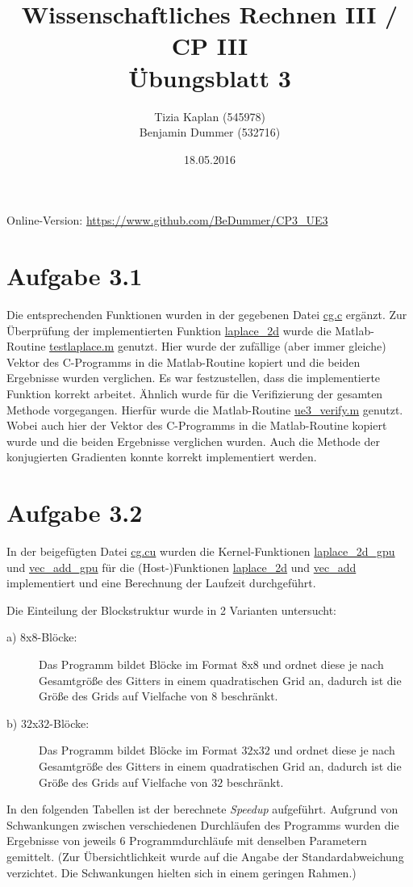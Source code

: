 \documentclass[%
	paper=A4,	%
	pagesize,	%
	DIV=calc,	%
	smallheadings,	%
	ngerman		%
]{scrartcl}
\title{{\bf Wissenschaftliches Rechnen III / CP III}\\Übungsblatt 3}
\author{Tizia Kaplan (545978)\\Benjamin Dummer (532716)}
\date{18.05.2016}
\begin{document}
\maketitle
Online-Version: \href{https://www.github.com/BeDummer/CP3_UE3}{\url{https://www.github.com/BeDummer/CP3_UE3}}

\section*{Aufgabe 3.1}
Die entsprechenden Funktionen wurden in der gegebenen Datei \url{cg.c} ergänzt. Zur Überprüfung der implementierten Funktion \url{laplace\_2d} wurde die Matlab-Routine \url{testlaplace.m} genutzt. Hier wurde der \glqq zufällige \grqq (aber immer gleiche) Vektor des C-Programms in die Matlab-Routine kopiert und die beiden Ergebnisse wurden verglichen. Es war festzustellen, dass die implementierte Funktion korrekt arbeitet.
Ähnlich wurde für die Verifizierung der gesamten Methode vorgegangen. Hierfür wurde die Matlab-Routine \url{ue3_verify.m} genutzt. Wobei auch hier der Vektor des C-Programms in die Matlab-Routine kopiert wurde und die beiden Ergebnisse verglichen wurden. Auch die Methode der konjugierten Gradienten konnte korrekt implementiert werden.

\section*{Aufgabe 3.2}
In der beigefügten Datei \url{cg.cu} wurden die Kernel-Funktionen \url{laplace_2d_gpu} und \url{vec_add_gpu} für die (Host-)Funktionen \url{laplace_2d} und \url{vec_add} implementiert und eine Berechnung der Laufzeit durchgeführt. 

Die Einteilung der Blockstruktur wurde in 2 Varianten untersucht:
\begin{description}
	\item[a) $8$x$8$-Blöcke: ] Das Programm bildet Blöcke im Format $8$x$8$ und ordnet diese je nach Gesamtgröße des Gitters in einem quadratischen Grid an, dadurch ist die Größe des Grids auf Vielfache von $8$ beschränkt.
	\item[b) $32$x$32$-Blöcke: ] Das Programm bildet Blöcke im Format $32$x$32$ und ordnet diese je nach Gesamtgröße des Gitters in einem quadratischen Grid an, dadurch ist die Größe des Grids auf Vielfache von $32$ beschränkt.
\end{description}

In den folgenden Tabellen ist der berechnete \emph{Speedup} aufgeführt. Aufgrund von Schwankungen zwischen verschiedenen Durchläufen des Programms wurden die Ergebnisse von jeweils 6 Programmdurchläufe mit denselben Parametern gemittelt. (Zur Übersichtlichkeit wurde auf die Angabe der Standardabweichung verzichtet. Die Schwankungen hielten sich in einem geringen Rahmen.)
\end{document}
